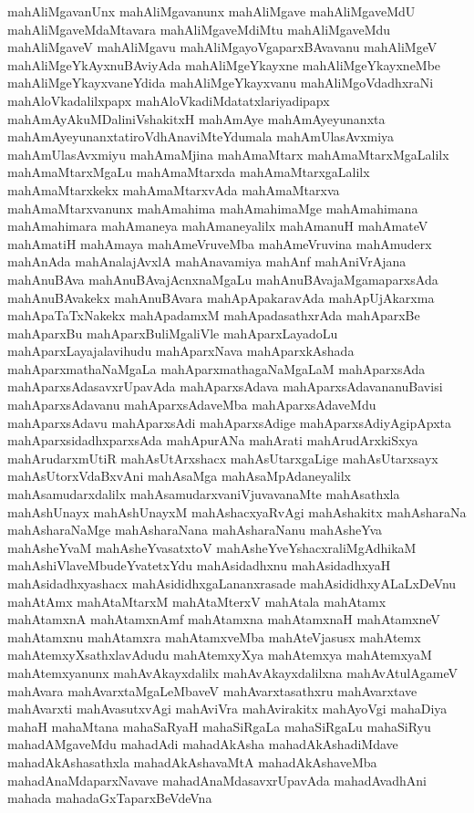 {mahAliMgavanUnx
mahAliMgavanunx
mahAliMgave
mahAliMgaveMdU
mahAliMgaveMdaMtavara
mahAliMgaveMdiMtu
mahAliMgaveMdu
mahAliMgaveV
mahAliMgavu
mahAliMgayoVgaparxBAvavanu
mahAliMgeV
mahAliMgeYkAyxnuBAviyAda
mahAliMgeYkayxne
mahAliMgeYkayxneMbe
mahAliMgeYkayxvaneYdida
mahAliMgeYkayxvanu
mahAliMgoVdadhxraNi
mahAloVkadalilxpapx
mahAloVkadiMdatatxlariyadipapx
mahAmAyAkuMDaliniVshakitxH
mahAmAye
mahAmAyeyunanxta
mahAmAyeyunanxtatiroVdhAnaviMteYdumala
mahAmUlasAvxmiya
mahAmUlasAvxmiyu
mahAmaMjina
mahAmaMtarx
mahAmaMtarxMgaLalilx
mahAmaMtarxMgaLu
mahAmaMtarxda
mahAmaMtarxgaLalilx
mahAmaMtarxkekx
mahAmaMtarxvAda
mahAmaMtarxva
mahAmaMtarxvanunx
mahAmahima
mahAmahimaMge
mahAmahimana
mahAmahimara
mahAmaneya
mahAmaneyalilx
mahAmanuH
mahAmateV
mahAmatiH
mahAmaya
mahAmeVruveMba
mahAmeVruvina
mahAmuderx
mahAnAda
mahAnalajAvxlA
mahAnavamiya
mahAnf
mahAniVrAjana
mahAnuBAva
mahAnuBAvajAcnxnaMgaLu
mahAnuBAvajaMgamaparxsAda
mahAnuBAvakekx
mahAnuBAvara
mahApApakaravAda
mahApUjAkarxma
mahApaTaTxNakekx
mahApadamxM
mahApadasathxrAda
mahAparxBe
mahAparxBu
mahAparxBuliMgaliVle
mahAparxLayadoLu
mahAparxLayajalavihudu
mahAparxNava
mahAparxkAshada
mahAparxmathaNaMgaLa
mahAparxmathagaNaMgaLaM
mahAparxsAda
mahAparxsAdasavxrUpavAda
mahAparxsAdava
mahAparxsAdavananuBavisi
mahAparxsAdavanu
mahAparxsAdaveMba
mahAparxsAdaveMdu
mahAparxsAdavu
mahAparxsAdi
mahAparxsAdige
mahAparxsAdiyAgipApxta
mahAparxsidadhxparxsAda
mahApurANa
mahArati
mahArudArxkiSxya
mahArudarxmUtiR
mahAsUtArxshacx
mahAsUtarxgaLige
mahAsUtarxsayx
mahAsUtorxVdaBxvAni
mahAsaMga
mahAsaMpAdaneyalilx
mahAsamudarxdalilx
mahAsamudarxvaniVjuvavanaMte
mahAsathxla
mahAshUnayx
mahAshUnayxM
mahAshacxyaRvAgi
mahAshakitx
mahAsharaNa
mahAsharaNaMge
mahAsharaNana
mahAsharaNanu
mahAsheYva
mahAsheYvaM
mahAsheYvasatxtoV
mahAsheYveYshacxraliMgAdhikaM
mahAshiVlaveMbudeYvatetxYdu
mahAsidadhxnu
mahAsidadhxyaH
mahAsidadhxyashacx
mahAsididhxgaLananxrasade
mahAsididhxyALaLxDeVnu
mahAtAmx
mahAtaMtarxM
mahAtaMterxV
mahAtala
mahAtamx
mahAtamxnA
mahAtamxnAmf
mahAtamxna
mahAtamxnaH
mahAtamxneV
mahAtamxnu
mahAtamxra
mahAtamxveMba
mahAteVjasusx
mahAtemx
mahAtemxyXsathxlavAdudu
mahAtemxyXya
mahAtemxya
mahAtemxyaM
mahAtemxyanunx
mahAvAkayxdalilx
mahAvAkayxdalilxna
mahAvAtulAgameV
mahAvara
mahAvarxtaMgaLeMbaveV
mahAvarxtasathxru
mahAvarxtave
mahAvarxti
mahAvasutxvAgi
mahAviVra
mahAvirakitx
mahAyoVgi
mahaDiya
mahaH
mahaMtana
mahaSaRyaH
mahaSiRgaLa
mahaSiRgaLu
mahaSiRyu
mahadAMgaveMdu
mahadAdi
mahadAkAsha
mahadAkAshadiMdave
mahadAkAshasathxla
mahadAkAshavaMtA
mahadAkAshaveMba
mahadAnaMdaparxNavave
mahadAnaMdasavxrUpavAda
mahadAvadhAni
mahada
mahadaGxTaparxBeVdeVna
}
